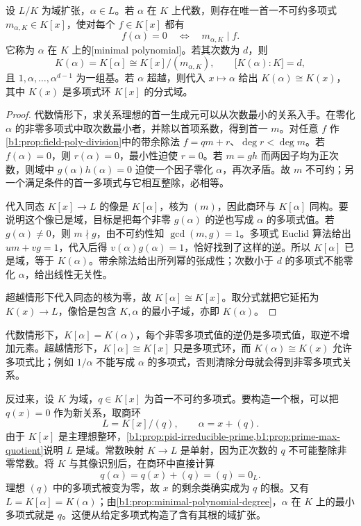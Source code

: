 \begin{proposition}\label{b1:prop:minimal-polynomial-degree}
	设 \(L/K\) 为域扩张，\(\alpha\in L\)。若 \(\alpha\) 在 \(K\) 上代数，则存在唯一首一不可约多项式 \(m_{\alpha,K}\in K[x]\)，使对每个 \(f\in K[x]\) 都有
	\[
		f(\alpha)=0\quad\Longleftrightarrow\quad m_{\alpha,K}\mid f.
	\]
	它称为 \(\alpha\) 在 \(K\) 上的[minimal polynomial]。若其次数为 \(d\)，则
	\[
		K(\alpha)=K[\alpha]\cong K[x]/(m_{\alpha,K}),\qquad \bigl[K(\alpha):K\bigr]=d,
	\]
	且 \(1,\alpha,\ldots,\alpha^{d-1}\) 为一组基。若 \(\alpha\) 超越，则代入 \(x\mapsto\alpha\) 给出 \(K(\alpha)\cong K(x)\)，其中 \(K(x)\) 是多项式环 \(K[x]\) 的分式域。
\end{proposition}
\begin{proof}
	代数情形下，求关系理想的首一生成元可以从次数最小的关系入手。在零化 \(\alpha\) 的非零多项式中取次数最小者，并除以首项系数，得到首一 \(m\)。对任意 \(f\) 作\cref{b1:prop:field-poly-division}中的带余除法 \(f=qm+r\)、\(\deg r<\deg m\)。若 \(f(\alpha)=0\)，则 \(r(\alpha)=0\)，最小性迫使 \(r=0\)。若 \(m=gh\) 而两因子均为正次数，则域中 \(g(\alpha)h(\alpha)=0\) 迫使一个因子零化 \(\alpha\)，再次矛盾。故 \(m\) 不可约；另一个满足条件的首一多项式与它相互整除，必相等。

	代入同态 \(K[x]\rightarrow L\) 的像是 \(K[\alpha]\)，核为 \((m)\)，因此商环与 \(K[\alpha]\) 同构。要说明这个像已是域，目标是把每个非零 \(g(\alpha)\) 的逆也写成 \(\alpha\) 的多项式值。若 \(g(\alpha)\neq0\)，则 \(m\nmid g\)，由不可约性知 \(\gcd(m,g)=1\)。多项式 Euclid 算法给出 \(um+vg=1\)，代入后得 \(v(\alpha)g(\alpha)=1\)，恰好找到了这样的逆。所以 \(K[\alpha]\) 已是域，等于 \(K(\alpha)\)。带余除法给出所列幂的张成性；次数小于 \(d\) 的多项式不能零化 \(\alpha\)，给出线性无关性。

	超越情形下代入同态的核为零，故 \(K[\alpha]\cong K[x]\)。取分式就把它延拓为 \(K(x)\rightarrow L\)，像恰是包含 \(K,\alpha\) 的最小子域，亦即 \(K(\alpha)\)。
\end{proof}
代数情形下，\(K[\alpha]=K(\alpha)\)，每个非零多项式值的逆仍是多项式值，取逆不增加元素。超越情形下，\(K[\alpha]\cong K[x]\) 只是多项式环，而 \(K(\alpha)\cong K(x)\) 允许多项式比；例如 \(1/\alpha\) 不能写成 \(\alpha\) 的多项式，否则清除分母就会得到非零多项式关系。

\ProseParagraphBreak
反过来，设 \(K\) 为域，\(q\in K[x]\) 为首一不可约多项式。要构造一个根，可以把 \(q(x)=0\) 作为新关系，取商环
\[
	L=K[x]/(q),\qquad \alpha=x+(q).
\]
由于 \(K[x]\) 是主理想整环，\cref{b1:prop:pid-irreducible-prime,b1:prop:prime-max-quotient}说明 \(L\) 是域。常数映射 \(K\rightarrow L\) 是单射，因为正次数的 \(q\) 不可能整除非零常数。将 \(K\) 与其像识别后，在商环中直接计算
\[
	q(\alpha)=q(x)+(q)=(q)=0_L.
\]
理想 \((q)\) 中的多项式被变为零，故 \(x\) 的剩余类确实成为 \(q\) 的根。又有 \(L=K[\alpha]=K(\alpha)\)；由\cref{b1:prop:minimal-polynomial-degree}，\(\alpha\) 在 \(K\) 上的最小多项式就是 \(q\)。这便从给定多项式构造了含有其根的域扩张。

